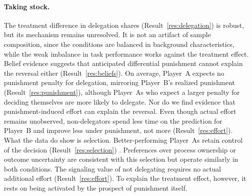 \paragraph{Taking stock.} The treatment difference in delegation shares (Result~\ref{res:delegation}) is robust, but its mechanism remains unresolved. It is not an artifact of sample composition, since the conditions are balanced in background characteristics, while the weak imbalance in task performance works against the treatment effect. Belief evidence suggests that anticipated differential punishment cannot explain the reversal either (Result~\ref{res:beliefs}). On average, Player~A expects no punishment penalty for delegation, mirroring Player~B's realized punishment (Result~\ref{res:punishment}), although Player~As who expect a larger penalty for deciding themselves are more likely to delegate. Nor do we find evidence that punishment-induced effort can explain the reversal. Even though actual effort remains unobserved, non-delegators spend less time on the prediction for Player~B and improve less under punishment, not more (Result~\ref{res:effort}). What the data do show is selection. Better-performing Player~As retain control of the decision (Result~\ref{res:selection})%
. Preferences over process ownership or outcome uncertainty are consistent with this selection but operate similarly in both conditions. %
The signaling value of not delegating requires no actual additional effort (Result~\ref{res:effort}). To explain the treatment effect, however, it %
rests on being activated by the prospect of punishment itself.















